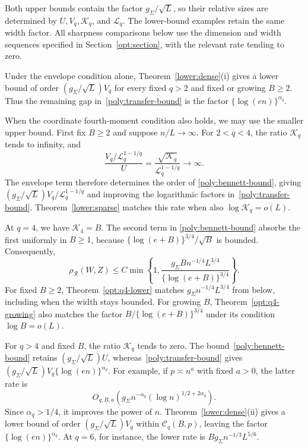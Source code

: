 \documentclass[11pt,letterpaper,twoside,leqno]{article}
\theoremstyle{bookplain}
\theoremstyle{bookremark}
\newcommand{\rh}{\rho_{\mathcal R}}
\begin{document}
Both upper bounds contain the factor $g_\Sigma/\sqrt L$, so their
relative sizes are determined by $U,V_q,\mathcal K_q$, and
$\mathcal L_q$. The lower-bound examples retain the same width
factor. All sharpness comparisons below use the dimension and width
sequences specified in Section~\ref{opt:section}, with the relevant
rate tending to zero.

Under the envelope condition alone,
Theorem~\ref{lower:dense}\textup{(i)} gives a lower bound of order
$(g_\Sigma/\sqrt L)V_q$ for every fixed $q>2$ and fixed or growing
$B\ge2$. Thus the remaining gap in~\eqref{poly:transfer-bound} is
the factor $\{\log(en)\}^{\alpha_q}$.

When the coordinate fourth-moment condition also holds, we may use
the smaller upper bound. First fix $B\ge2$ and suppose $n/L\to\infty$.
For $2<q<4$, the ratio $\mathcal K_q$ tends to infinity, and
\[
 \frac{V_q/\mathcal L_q^{1-1/q}}U
 =\frac{\sqrt{\mathcal K_q}}{\mathcal L_q^{1-1/q}}\to\infty.
\]
The envelope term therefore determines the order of
\eqref{poly:bennett-bound}, giving
$(g_\Sigma/\sqrt L)V_q/\mathcal L_q^{1-1/q}$ and improving the
logarithmic factors in~\eqref{poly:transfer-bound}.
Theorem~\ref{lower:sparse} matches this rate when also
$\log\mathcal K_q=o(L)$.

At $q=4$, we have $\mathcal K_4=B$. The second term in
\eqref{poly:bennett-bound} absorbs the first uniformly in $B\ge1$,
because $\{\log(e+B)\}^{3/4}/\sqrt B$ is bounded. Consequently,
\begin{equation}
 \rh(W,Z)\le C\min\left\{1,
 \frac{g_\Sigma Bn^{-1/4}L^{3/4}}
 {\{\log(e+B)\}^{3/4}}\right\}.
 \label{poly:q4}
\end{equation}
For fixed $B\ge2$, Theorem~\ref{opt:q4-lower} matches
$g_\Sigma n^{-1/4}L^{3/4}$ from below, including when the width
stays bounded. For growing $B$, Theorem~\ref{opt:q4-growing} also
matches the factor $B/\{\log(e+B)\}^{3/4}$ under its condition
$\log B=o(L)$.

For $q>4$ and fixed $B$, the ratio $\mathcal K_q$ tends to zero.
The bound~\eqref{poly:bennett-bound} retains
$(g_\Sigma/\sqrt L)U$, whereas~\eqref{poly:transfer-bound} gives
$(g_\Sigma/\sqrt L)V_q\{\log(en)\}^{\alpha_q}$.
For example, if $p\asymp n^a$ with fixed $a>0$, the latter rate is
\[
 O_{q,B,a}\!\left(g_\Sigma n^{-\alpha_q}
                    (\log n)^{1/2+2\alpha_q}\right).
\]
Since $\alpha_q>1/4$, it improves the power of $n$.
Theorem~\ref{lower:dense}\textup{(ii)} gives a lower bound of order
$(g_\Sigma/\sqrt L)V_q$ within $\mathcal C_q(B,p)$, leaving the
factor $\{\log(en)\}^{\alpha_q}$. At $q=6$, for instance, the
lower rate is $Bg_\Sigma n^{-1/3}L^{5/6}$.
\end{document}
